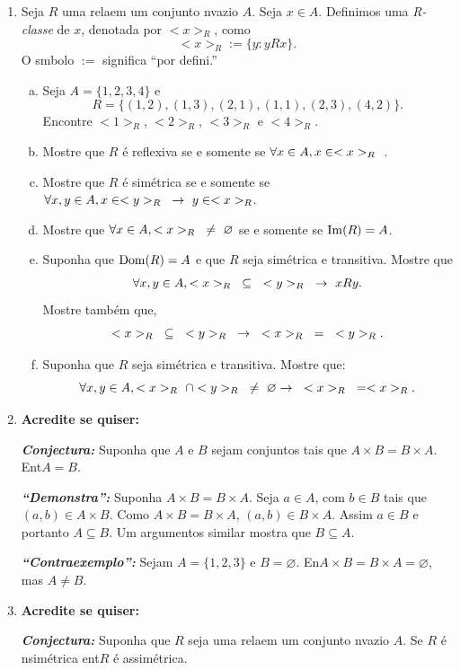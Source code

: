 \begin{enumerate}[{\bf 1.}]
\item Seja $R$ uma rela\cao em um conjunto n\ao vazio $A$. Seja $x\in A$. Definimos uma {\it R-classe} de $x$, denotada por $<x>_R$, como
\[
<x>_R:=\{y:yRx\}.
\]
O s\ih mbolo $:=$ significa ``por defini\caoi.''
\begin{enumerate}[a)]
\item Seja $A=\{1,2,3,4\}$ e
\[
R=\{(1,2), (1,3), (2,1), (1,1), (2,3), (4,2)\}.
\] 
Encontre $<1>_R$, $<2>_R$, $<3>_R$ e $<4>_R$. 
\item Mostre que $R$ \'e reflexiva se e somente se $\forall x\in A, x\in <x>_R\textrm{ }$.
\item Mostre que $R$ \'e sim\'etrica se e somente se $\forall x,y\in A, x\in <y>_R\textrm{ }\to\textrm{ } y\in <x>_R$.
\item Mostre que $\forall x\in A, <x>_R\textrm{ }\neq\textrm{ }\varnothing$ se e somente se $\operatorname{Im}(R)=A$.
\item Suponha que $\operatorname{Dom}(R)=A$ e que $R$ seja sim\'etrica e transitiva. Mostre que
\[
\forall x,y\in A, <x>_R\textrm{ }\subseteq\textrm{ }<y>_R\textrm{ }\to\textrm{ } xRy.
\]
Mostre tamb\'em que,
\[
<x>_R\textrm{ }\subseteq\textrm{ }<y>_R\textrm{ }\to\textrm{ } <x>_R\textrm{ }=\textrm{ }<y>_R.
\]
\item Suponha que $R$ seja sim\'etrica e transitiva. Mostre que:
\[
\forall x,y\in A, <x>_R\textrm{ }\cap <y>_R\textrm{ }\neq\textrm{ }\varnothing\to\textrm{ } <x>_R\textrm{ }=<x>_R.
\]
\end{enumerate}

\item {\bf Acredite se quiser:}  

\noindent \textit{\textbf{Conjectura:}} Suponha que $A$ e $B$ sejam conjuntos tais que $A\times B=B\times A$. Ent\ao $A=B$.

\noindent \textit{\textbf{``Demonstra\caoi'':}} Suponha $A\times B=B\times A$. Seja $a\in A$, com $b\in B$ tais que $(a,b)\in A\times B$. Como $A\times B=B\times A$, $(a,b)\in B\times A$. Assim $a\in B$ e portanto $A\subseteq B$. Um argumentos similar mostra que $B\subseteq A$.

\noindent \textit{\textbf{``Contraexemplo'':}} Sejam $A=\{1,2,3\}$ e $B=\varnothing$. En\tao $A\times B=B\times A=\varnothing$, mas $A\neq B$. 

\item {\bf Acredite se quiser:}  

\noindent \textit{\textbf{Conjectura:}} Suponha que $R$ seja uma rela\cao em um conjunto n\ao vazio $A$. Se $R$ \'e n\ao sim\'etrica ent\ao $R$ \'e assim\'etrica. 


\end{enumerate}
